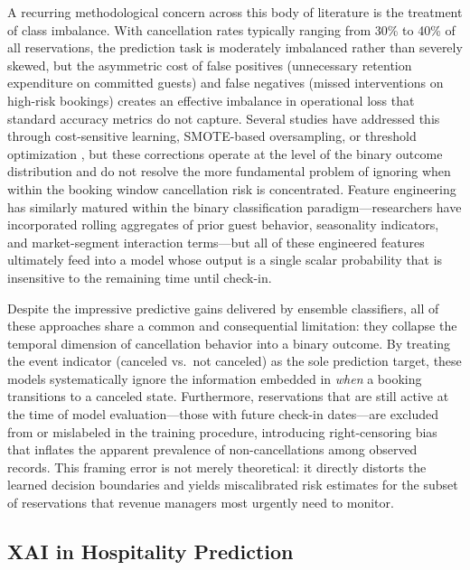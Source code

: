 \documentclass[pdflatex,sn-mathphys-ay]{sn-jnl}
\theoremstyle{thmstyleone}%
\theoremstyle{thmstyletwo}%
\theoremstyle{thmstylethree}%
\begin{document}
A recurring methodological concern across this body of literature is the treatment of class imbalance. With cancellation rates typically ranging from 30\% to 40\% of all reservations, the prediction task is moderately imbalanced rather than severely skewed, but the asymmetric cost of false positives (unnecessary retention expenditure on committed guests) and false negatives (missed interventions on high-risk bookings) creates an effective imbalance in operational loss that standard accuracy metrics do not capture. Several studies have addressed this through cost-sensitive learning, SMOTE-based oversampling, or threshold optimization \citep{liu2023hospitality, ampountolas2025predicting}, but these corrections operate at the level of the binary outcome distribution and do not resolve the more fundamental problem of ignoring when within the booking window cancellation risk is concentrated. Feature engineering has similarly matured within the binary classification paradigm—researchers have incorporated rolling aggregates of prior guest behavior, seasonality indicators, and market-segment interaction terms—but all of these engineered features ultimately feed into a model whose output is a single scalar probability that is insensitive to the remaining time until check-in.

Despite the impressive predictive gains delivered by ensemble classifiers, all of these approaches share a common and consequential limitation: they collapse the temporal dimension of cancellation behavior into a binary outcome. By treating the event indicator (canceled vs.\ not canceled) as the sole prediction target, these models systematically ignore the information embedded in \textit{when} a booking transitions to a canceled state. Furthermore, reservations that are still active at the time of model evaluation—those with future check-in dates—are excluded from or mislabeled in the training procedure, introducing right-censoring bias that inflates the apparent prevalence of non-cancellations among observed records. This framing error is not merely theoretical: it directly distorts the learned decision boundaries and yields miscalibrated risk estimates for the subset of reservations that revenue managers most urgently need to monitor.

\subsection{XAI in Hospitality Prediction}
\end{document}
